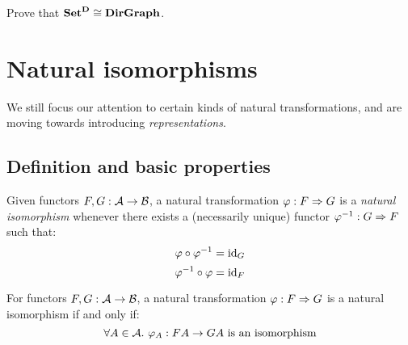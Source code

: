 \begin{exercise}
Prove that $\mathbf {Set}^{\mathbf D} \cong \mathbf {DirGraph}$.
\end{exercise}


\chapter{Natural isomorphisms}


We still focus our attention to certain kinds of natural transformations, and
are moving towards introducing \emph{representations}.

\section{Definition and basic properties}

\begin{definition}
Given functors $F, G : \mathcal{A} \to \mathcal{B}$, a natural transformation
$\varphi: F \Rightarrow G$ is a \emph{natural isomorphism} whenever there exists a
(necessarily unique) functor $\varphi^{-1}: G \Rightarrow F$ such that:
\[ \varphi \circ \varphi^{-1} = \mathrm{id}_{ G } \]
\[ \varphi^{-1} \circ \varphi = \mathrm{id}_{ F } \]
\end{definition}

\begin{theorem}
For functors $F, G : \mathcal{A} \to \mathcal{B}$, a natural transformation
$\varphi: F \Rightarrow G$ is a natural isomorphism if and only if:
\[ \forall A \in \mathcal{A}.\ \text{$\varphi_A: FA \to GA$ is an isomorphism} \]
\end{theorem}

